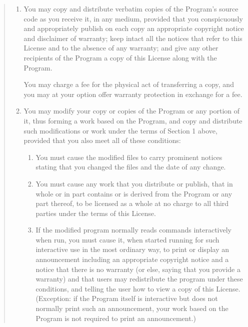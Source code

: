 \documentclass[twoside,11pt]{article}
\renewcommand{\_}{\texttt{\symbol{95}}}
\begin{document}
\begin{quote}
\begin{enumerate}
\item You may copy and distribute verbatim copies of the Program's source
  code as you receive it, in any medium, provided that you conspicuously
  and appropriately publish on each copy an appropriate copyright notice
  and disclaimer of warranty; keep intact all the notices that refer to
  this License and to the absence of any warranty; and give any other
  recipients of the Program a copy of this License along with the Program.

You may charge a fee for the physical act of transferring a copy, and you
may at your option offer warranty protection in exchange for a fee.

\item

You may modify your copy or copies of the Program or any portion
of it, thus forming a work based on the Program, and copy and
distribute such modifications or work under the terms of Section 1
above, provided that you also meet all of these conditions:

\begin{enumerate}

\item 

You must cause the modified files to carry prominent notices stating that
you changed the files and the date of any change.

\item

You must cause any work that you distribute or publish, that in
whole or in part contains or is derived from the Program or any
part thereof, to be licensed as a whole at no charge to all third
parties under the terms of this License.

\item
If the modified program normally reads commands interactively
when run, you must cause it, when started running for such
interactive use in the most ordinary way, to print or display an
announcement including an appropriate copyright notice and a
notice that there is no warranty (or else, saying that you provide
a warranty) and that users may redistribute the program under
these conditions, and telling the user how to view a copy of this
License.  (Exception: if the Program itself is interactive but
does not normally print such an announcement, your work based on
the Program is not required to print an announcement.)

\end{enumerate}



\end{enumerate}
\end{quote}
\end{document}
